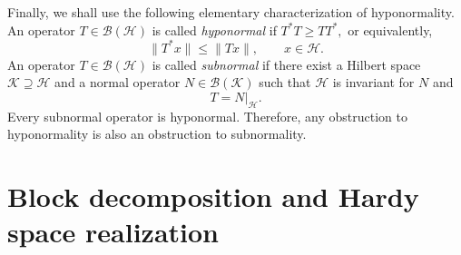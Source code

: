 \documentclass[12pt]{amsart}
\theoremstyle{definition}
\theoremstyle{remark}
\newcommand{\clb}{\mathcal{B}}
\newcommand{\clh}{\mathcal{H}}
\newcommand{\clk}{\mathcal{K}}
\newcommand\restr[2]{\ensuremath{\left.#1\right|_{#2}}}
\numberwithin{equation}{section}
\begin{document}
Finally, we shall use the following elementary characterization of hyponormality. An operator $T\in\clb(\clh)$ is called \emph{hyponormal} if $T^*T\geq TT^*,$ or equivalently,
\[
\|T^*x\|\leq \|Tx\|,
\qquad x\in\clh.
\]
An operator $T\in\clb(\clh)$ is called \emph{subnormal} if there exist a Hilbert space $\clk\supseteq\clh$ and a normal operator $N\in\clb(\clk)$ such that $\clh$ is invariant for $N$ and
\[
T=\restr{N}{\clh}.
\]
Every subnormal operator is hyponormal. Therefore, any obstruction to hyponormality is also an obstruction to subnormality.







\section{Block decomposition and Hardy space realization}\label{sec:BDHSR}
\end{document}
